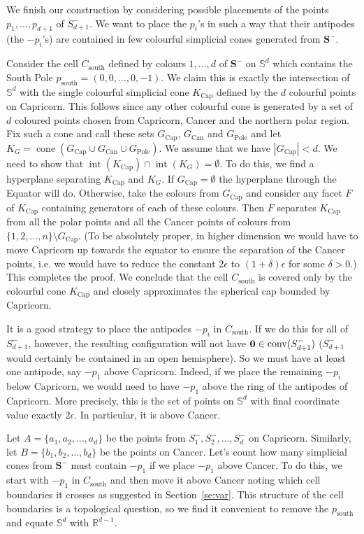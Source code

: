 \documentclass[epsbox,12pt,reqno]{amsart}
\theoremstyle{definition}
\theoremstyle{remark}
\def\S{\mathbf{S}}
\def\cone{\operatorname{cone}}
\def\conv{\operatorname{conv}}
\def\south{\operatorname{south}}
\def\interior{\operatorname{int}}
\def\R{\mathbb{R}}
\def\Sph{\mathbb{S}}
\def\zero{{\bf 0}}
\def\Cap{\operatorname{Cap}}
\def\Can{\operatorname{Can}}
\def\Pole{\operatorname{Pole}}
\begin{document}
We finish our construction by considering possible placements
of the points $p_1, \ldots, p_{d+1}$ of $S_{d+1}^\minus$.
We want to place the $p_i$'s in such a way that their antipodes
(the $-p_i$'s) are contained in few colourful simplicial cones generated
from $\S^\minus$.  

Consider the cell $C_{\south}$ defined by colours $1,\ldots,d$ of
$\S^\minus$ on $\Sph^d$ which contains the South Pole 
$p_{\south}=(0,0, \ldots, 0,-1)$.
We claim this is exactly the intersection of $\Sph^d$ with 
the single colourful simplicial cone $K_{\Cap}$ defined by the $d$ 
colourful points on Capricorn.  
This follows since any other colourful cone 
is generated by a set of $d$ coloured points 
chosen from Capricorn, Cancer and the northern polar region.
Fix such a cone and call these sets ${G_{\Cap}}$, $G_{\Can}$ and
$G_{\Pole}$ and let $K_G = \cone(G_{\Cap} \cup G_{\Can} \cup G_{\Pole})$.  
We assume that we have $|G_{\Cap}| < d$.
We need to show that 
$\interior(K_{\Cap}) \cap \interior(K_G) = \emptyset$.
To do this, we find a hyperplane separating $K_{\Cap}$ and $K_G$.
If $G_{\Cap}=\emptyset$ the hyperplane through the Equator will do.
Otherwise, take the colours from $G_{\Cap}$ and consider any
facet $F$ of $K_{\Cap}$ containing generators of each of these colours.  
Then $F$ separates $K_{\Cap}$ from all the polar points and all the 
Cancer points of colours from $\{1,2,\ldots,n\} \setminus G_{\Cap}$.
(To be absolutely
proper, in higher dimension we would have to move Capricorn up 
towards the equator to ensure the separation of the Cancer points, 
i.e. we would have to reduce the constant $2\epsilon$ to 
$(1+\delta)\epsilon$ for some $\delta>0$.)
This completes the proof.  We conclude that the cell $C_{\south}$ 
is covered only by the colourful cone $K_{\Cap}$ and 
closely approximates the spherical cap bounded by Capricorn.

It is a good strategy to place the antipodes $-p_i$ in $C_{\south}$.
If we do this for all of $S_{d+1}^\minus$, however, 
the resulting configuration will not have $\zero \in \conv(S_{d+1}^\minus)$
($S_{d+1}^\minus$ would certainly be contained in an open hemisphere).
So we must have at least one antipode, say $-p_1$ above Capricorn.
Indeed, if we place the remaining $-p_i$ below Capricorn, we
would need to have $-p_1$ above the ring of the antipodes
of Capricorn.  More precisely, this is the set of points on $\Sph^d$ 
with final coordinate value exactly $2\epsilon$.  In particular,
it is above Cancer.

Let $A=\{a_1, a_2, \ldots, a_d\}$ be the points from 
$S_1^\minus, S_2^\minus, \ldots, S_d^\minus$ 
on Capricorn.  Similarly, let $B=\{b_1, b_2, \ldots, b_d\}$ be 
the points on Cancer.  Let's count how many simplicial cones
from $\S^\minus$ must contain $-p_1$ if we place $-p_1$ above Cancer.
To do this, we start with $-p_1$ in $C_{\south}$ and then move it
above Cancer noting which cell boundaries it crosses as suggested
in Section~\ref{se:var}.  This structure of the cell boundaries
is a topological question, so we find it convenient to remove the
$p_{\south}$ and equate $\Sph^d$ with $\R^{d-1}$.  
\end{document}
